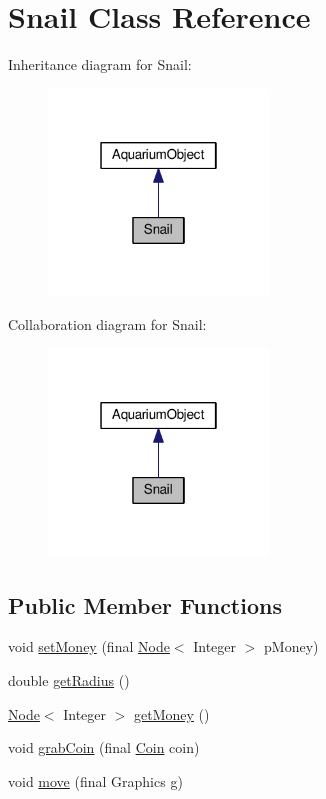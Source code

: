 \hypertarget{class_snail}{}\section{Snail Class Reference}
\label{class_snail}


Inheritance diagram for Snail\+:
\nopagebreak
\begin{figure}[H]
\begin{center}
\leavevmode
\includegraphics[width=166pt]{class_snail__inherit__graph}
\end{center}
\end{figure}


Collaboration diagram for Snail\+:
\nopagebreak
\begin{figure}[H]
\begin{center}
\leavevmode
\includegraphics[width=166pt]{class_snail__coll__graph}
\end{center}
\end{figure}
\subsection*{Public Member Functions}
\begin{DoxyCompactItemize}
\item 
void \mbox{\hyperlink{class_snail_a99cf307667441615ed79de2fd4ba5fe5}{set\+Money}} (final \mbox{\hyperlink{class_node}{Node}}$<$ Integer $>$ p\+Money)
\item 
double \mbox{\hyperlink{class_snail_a6b26b21e7bf3702c9e263cae1a9bc3ad}{get\+Radius}} ()
\item 
\mbox{\hyperlink{class_node}{Node}}$<$ Integer $>$ \mbox{\hyperlink{class_snail_ad57c8cb98f65b980483ce326bc7e6031}{get\+Money}} ()
\item 
void \mbox{\hyperlink{class_snail_ad077a58207472113fae8ec37696d83e3}{grab\+Coin}} (final \mbox{\hyperlink{class_coin}{Coin}} coin)
\item 
void \mbox{\hyperlink{class_snail_a88ef832abb1c54f196242d47431ff866}{move}} (final Graphics g)
\end{DoxyCompactItemize}
